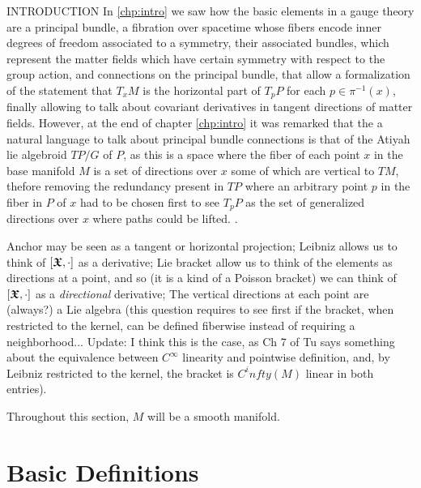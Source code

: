 INTRODUCTION  In \ref{chp:intro} we saw how the basic elements in a gauge theory are a principal bundle, a fibration over spacetime whose fibers encode inner degrees of freedom associated to a symmetry, their associated bundles, which represent the matter fields which have certain symmetry with respect to the group action, and connections on the principal bundle, that allow a formalization of the statement that $T_x M$ is the horizontal part of $T_p P$ for each $p \in \pi^{-1}(x)$, finally allowing to talk about covariant derivatives in tangent directions of matter fields. However, at the end of chapter \ref{chp:intro} it was remarked that the a natural language to talk about principal bundle connections is that of the Atiyah lie algebroid $TP/G$ of $P$, as this is a space where the fiber of each point $x$ in the base manifold $M$ is a set of directions over $x$ some of which are vertical to $TM$, thefore removing the redundancy present in $TP$ where an arbitrary point $p$ in the fiber in $P$ of $x$ had to be chosen first to see $T_p P$ as the set of generalized directions over $x$ where paths could be lifted. . 

Anchor may be seen as a tangent or horizontal projection; Leibniz allows us to think of $[\bm{\mathfrak{X}}, \cdot]$ as a derivative; Lie bracket allow us to think of the elements as directions at a point, and so (it is a kind of a Poisson bracket) we can think of $[\bm{\mathfrak{X}}, \cdot]$ as a \emph{directional} derivative; The vertical directions at each point are (always?) a Lie algebra (this question requires to see first if the bracket, when restricted to the kernel, can be defined fiberwise instead of requiring a neighborhood... Update: I think this is the case, as Ch 7 of Tu says something about the equivalence between $C^\infty$ linearity and pointwise definition, and, by Leibniz restricted to the kernel, the bracket is $C^infty(M)$ linear in both entries).

Throughout this section, $M$ will be a smooth manifold.

\section{Basic Definitions}


